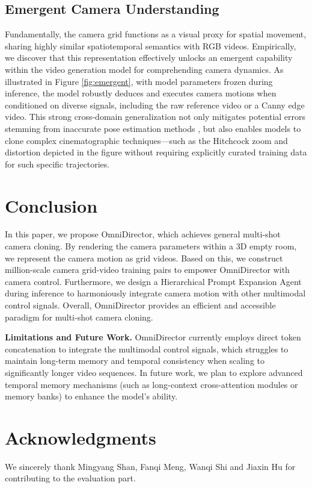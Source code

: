\documentclass[letterpaper]{article} %
\begin{document}
\subsection{Emergent Camera Understanding}

Fundamentally, the camera grid functions as a visual proxy for spatial movement, sharing highly similar spatiotemporal semantics with RGB videos. Empirically, we discover that this representation effectively unlocks an emergent capability within the video generation model for comprehending camera dynamics. As illustrated in Figure \ref{fig:emergent}, with model parameters frozen during inference, the model robustly deduces and executes camera motions when conditioned on diverse signals, including the raw reference video or a Canny edge video. This strong cross-domain generalization not only mitigates potential errors stemming from inaccurate pose estimation methods \cite{lin2025dpa3, keetha2026mapanything}, but also enables models to clone complex cinematographic techniques—such as the Hitchcock zoom and distortion depicted in the figure without requiring explicitly curated training data for such specific trajectories.

\section{Conclusion}

In this paper, we propose OmniDirector, which achieves general multi-shot camera cloning. By rendering the camera parameters within a 3D empty room, we represent the camera motion as grid videos. Based on this, we construct million-scale camera grid-video training pairs to empower OmniDirector with camera control. Furthermore, we design a Hierarchical Prompt Expansion Agent during inference to harmoniously integrate camera motion with other multimodal control signals. Overall, OmniDirector provides an efficient and accessible paradigm for multi-shot camera cloning.

\noindent\textbf{Limitations and Future Work.}  
OmniDirector currently employs direct token concatenation to integrate the multimodal control signals, which struggles to maintain long-term memory and temporal consistency when scaling to significantly longer video sequences. 
In future work, we plan to explore advanced temporal memory mechanisms (such as long-context cross-attention modules or memory banks) to enhance the model's ability.



\section*{Acknowledgments}
\bigskip
\noindent We sincerely thank Mingyang Shan, Fanqi Meng, Wanqi Shi and Jiaxin Hu for contributing to the evaluation part.

\end{document}
